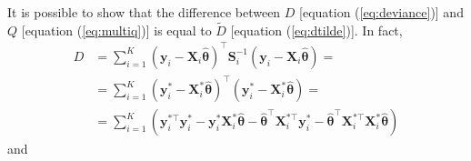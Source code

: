 It is possible to show that the difference between $D$ [equation (\ref{eq:deviance})] and $Q$ [equation (\ref{eq:multiq})] is equal to $\tilde{D}$ [equation (\ref{eq:dtilde})]. In fact,
\begin{align*}
D &= \sum_{i=1}^{K} \left(\mathbf{y}_i - \mathbf{X}_i \hat{\boldsymbol{\theta}}\right)^\top \mathbf{S}_i^{-1} \left(\mathbf{y}_i - \mathbf{X}_i  \hat{\boldsymbol{\theta}}\right) = \\
&= \sum_{i=1}^{K} \left(\mathbf{y}_i^* - \mathbf{X}_i^* \hat{\boldsymbol{\theta}}\right)^\top \left(\mathbf{y}_i^* - \mathbf{X}_i^*  \hat{\boldsymbol{\theta}}\right) = \\
&=\sum_{i=1}^K \left( \mathbf{y}_i^{*\top} \mathbf{y}_i^{*} - \mathbf{y}_i^{*} \mathbf{X}_i^* \hat{\boldsymbol{\theta}} - \hat{\boldsymbol{\theta}}^\top \mathbf{X}_i^{*\top} \mathbf{y}_i^{*} - \hat{\boldsymbol{\theta}}^\top \mathbf{X}_i^{*\top} \mathbf{X}_i^* \hat{\boldsymbol{\theta}} \right)
\end{align*}
and
